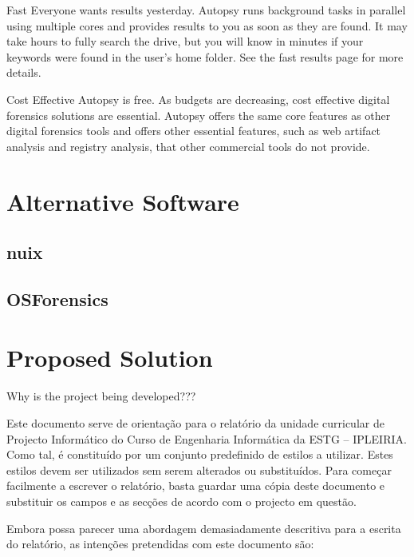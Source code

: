 Fast
Everyone wants results yesterday. Autopsy runs background tasks in parallel using multiple cores and provides results to you as soon as they are found. It may take hours to fully search the drive, but you will know in minutes if your keywords were found in the user's home folder. See the fast results page for more details.

Cost Effective
Autopsy is free. As budgets are decreasing, cost effective digital forensics solutions are essential. Autopsy offers the same core features as other digital forensics tools and offers other essential features, such as web artifact analysis and registry analysis, that other commercial tools do not provide.

\section{Alternative Software}


\subsection{nuix}


\subsection{OSForensics}


\section{Proposed Solution}

Why is the project being developed???

\pagebreak

Este documento serve de orientação para o relatório da unidade curricular de Projecto Informático do Curso de Engenharia Informática da ESTG – IPLEIRIA. Como tal, é constituído por um conjunto predefinido de estilos a utilizar. Estes estilos devem ser utilizados sem serem alterados ou substituídos. Para começar facilmente a escrever o relatório, basta guardar uma cópia deste documento e substituir os campos e as secções de acordo com o projecto em questão.

Embora possa parecer uma abordagem demasiadamente descritiva para a escrita do relatório, as intenções pretendidas com este documento são:

